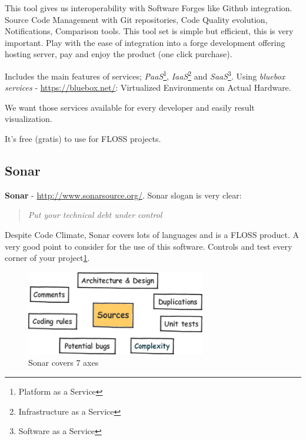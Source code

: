 \documentclass[11pt]{scrartcl}
\begin{document}
\par This tool gives us interoperability with Software Forges like Github integration. Source Code Management with Git repositories, Code Quality evolution, Notifications, Comparison tools. This tool set is simple but efficient, this is very important. Play with the ease of integration into a forge development offering hosting server, pay and enjoy the product (one click purchase).

\par Includes the main features of services; \emph{PaaS}\footnote{Platform as a Service}, \emph{IaaS}\footnote{Infrastructure as a Service} and \emph{SaaS}\footnote{Software as a Service}. Using \emph{bluebox services} - \url{https://bluebox.net/}: Virtualized Environments on Actual Hardware.

\par We want those services available for every developer and easily result visualization.

\par It's free (gratis) to use for FLOSS projects.


\subsection{Sonar}
\label{sub:sonar}

\textbf{Sonar} - \url{http://www.sonarsource.org/}. Sonar slogan is very clear:

\begin{quote}
    \emph{Put your technical debt under control}
\end{quote}

\par Despite Code Climate, Sonar covers lots of languages and is a FLOSS product. A very good point to consider for the use of this software. Controls and test every corner of your project\ref{sonar7axes}.

\begin{figure}[H]
\centering
\includegraphics[width=0.7\textwidth]{sonar7axes.png}
\caption{Sonar covers 7 axes}
\label{sonar7axes}
\end{figure}
\end{document}
